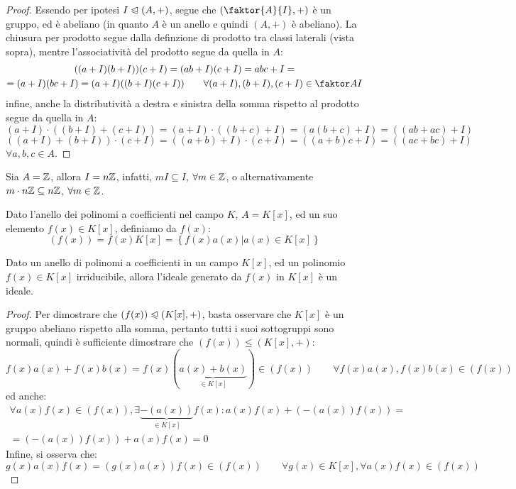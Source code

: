 \documentclass[11pt]{scrartcl}
\begin{document}
\begin{proof}
Essendo per ipotesi $I \trianglelefteqslant (A,+)$, segue che $\left(\faktor{A}{I},+\right)$ è un gruppo, ed è abeliano (in quanto $A$ è un anello e quindi $(A,+)$ è abeliano).
La chiusura per prodotto segue dalla definzione di prodotto tra classi laterali (vista sopra), mentre l'associatività del prodotto segue da quella in $A$:
	\begin{multline*}
		((a + I)(b + I))(c + I) = (ab + I)(c + I) = abc + I = \\
		=(a + I)(bc + I) = (a + I)((b + I)(c + I))
		\qquad 
		\forall (a + I),(b + I),(c + I) \in \faktor AI
		\end{multline*}
infine, anche la distributività a destra e sinistra della somma rispetto al prodotto segue da quella in $A$:
		\[ (a + I) \cdot ((b + I) + (c + I)) = (a + I) \cdot ((b + c) + I) = (a(b + c) + I) = ((ab + ac) + I) 
		\]\[ ((a + I) + (b + I)) \cdot (c + I) = ((a + b) + I) \cdot (c + I) = ((a + b)c + I) = ((ac + bc) + I)
		\]
$\forall a,b,c \in A$.
\end{proof}

\begin{example}
Sia $A=\mathbb Z$, allora $I = n\mathbb Z$, infatti, $mI \subseteq I$, $\forall m \in \mathbb Z$, o alternativamente $m \cdot n\mathbb Z \subseteq n\mathbb Z$, $\forall m \in \mathbb Z$.
\end{example}

\begin{definition}
Dato l'anello dei polinomi a coefficienti nel campo $K$, $A=K[x]$, ed un suo elemento $f(x) \in K[x]$, definiamo  da $f(x)$:
	\[ (f(x)) = f(x)K[x] = \left\{f(x)a(x) | a(x) \in K[x]\right\}
	\]
\end{definition}

\begin{proposition}
\label{p:3.51}
Dato un anello di polinomi a coefficienti in un campo $K[x]$, ed un polinomio $f(x) \in K[x]$ irriducibile, allora l'ideale generato da $f(x)$ in $K[x]$ è un ideale.
\end{proposition}

\begin{proof}
Per dimostrare che $(f(x)) \trianglelefteqslant (K[x], +)$, basta osservare che $K[x]$ è un gruppo abeliano rispetto alla somma, 
pertanto tutti i suoi sottogruppi sono normali, quindi è sufficiente dimostrare che $(f(x)) \leqslant (K[x],+)$:
	\[ f(x)a(x) + f(x)b(x) = f(x)(\underbrace{a(x)+b(x)}_{\in K[x]}) \in (f(x))
	\qquad \forall f(x)a(x),f(x)b(x) \in (f(x))
		\]
ed anche:
	\begin{multline*}
		\forall a(x)f(x) \in (f(x)), \exists \underbrace{-(a(x))}_{\in K[x]}f(x) : a(x)f(x) + (-(a(x))f(x)) = \\ 
		= (-(a(x))f(x)) + a(x)f(x) = 0
	\end{multline*}
Infine, si osserva che:
	\[ g(x)a(x)f(x) = (g(x)a(x))f(x) \in (f(x))
	\qquad
	\forall g(x) \in K[x], \forall a(x)f(x) \in (f(x))
		\]
\end{proof}
\end{document}
